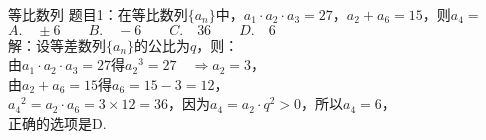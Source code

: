 \documentclass[aspectratio=169]{ctexbeamer} %
\date{\today}
\begin{document}
\begin{frame}[t]{等比数列}
题目1：在等比数列$\{a_n\}$中，$a_1 \cdot a_2 \cdot a_3 = 27$，$a_2 + a_6 = 15$，则$a_4 = $ \\
$A. \quad \pm 6 \qquad B. \quad -6 \qquad C. \quad 36 \qquad D. \quad 6$ \\

\vspace{0.5cm}
\pause
解：设等差数列$\{a_n\}$的公比为$q$，则：\\
\pause
由$a_1 \cdot a_2 \cdot a_3 = 27$得${a_2}^3 = 27 \quad \Rightarrow a_2 = 3$，\\
\pause
由$a_2 + a_6 = 15$得$a_6 = 15 - 3 = 12$，\\
\pause
${a_4}^2 = a_2 \cdot a_6 = 3 \times 12 = 36$，因为$a_4 = a_2 \cdot q^2 > 0$，所以$a_4 = 6$，\\
\pause
正确的选项是D.
\end{frame}
\end{document}
